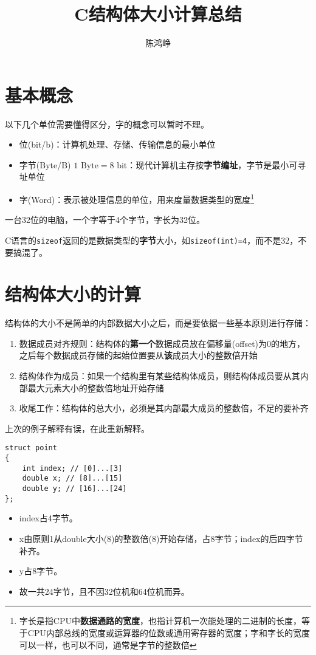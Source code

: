 \documentclass[11pt,UTF8]{ctexart}
\title{C结构体大小计算总结}
\author{陈鸿峥}
\date{}
\begin{document}
\maketitle
\section{基本概念}
\label{sec:introduction}
以下几个单位需要懂得区分，字的概念可以暂时不理。
\begin{itemize}
	\itemsep -3pt
	\item 位(bit/b)：计算机处理、存储、传输信息的最小单位
	\item 字节(Byte/B) $1\text{ Byte}=8\text{ bit}$：现代计算机主存按\textbf{字节编址}，字节是最小可寻址单位
	\item 字(Word)：表示被处理信息的单位，用来度量数据类型的宽度\footnote{字长是指CPU中\textbf{数据通路的宽度}，也指计算机一次能处理的二进制的长度，等于CPU内部总线的宽度或运算器的位数或通用寄存器的宽度；字和字长的宽度可以一样，也可以不同，通常是字节的整数倍}
\end{itemize}
\par 一台32位的电脑，一个字等于4个字节，字长为32位。
\par C语言的\verb'sizeof'返回的是数据类型的\textbf{字节}大小，如\verb'sizeof(int)=4'，而不是32，不要搞混了。

\section{结构体大小的计算}
结构体的大小不是简单的内部数据大小之后，而是要依据一些基本原则进行存储：
\begin{enumerate}
	\itemsep -3pt
	\item 数据成员对齐规则：结构体的\textbf{第一个}数据成员放在偏移量(offset)为0的地方，之后每个数据成员存储的起始位置要从\textbf{该}成员大小的整数倍开始
	\item 结构体作为成员：如果一个结构里有某些结构体成员，则结构体成员要从其内部最大元素大小的整数倍地址开始存储
	\item 收尾工作：结构体的总大小，必须是其内部最大成员的整数倍，不足的要补齐
\end{enumerate}

上次的例子解释有误，在此重新解释。
\begin{example}
\begin{lstlisting}
struct point
{
    int index; // [0]...[3]
    double x; // [8]...[15]
    double y; // [16]...[24]
};
\end{lstlisting}
\end{example}
\begin{analysis}
\begin{itemize}
	\itemsep -3pt
	\item index占4字节。
	\item x由原则1从double大小(8)的整数倍(8)开始存储，占8字节；index的后四字节补齐。
	\item y占8字节。
	\item 故一共24字节，且不因32位机和64位机而异。
\end{itemize}
\end{analysis}
\end{document}
